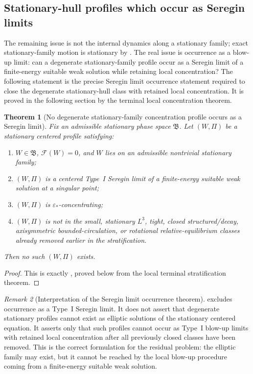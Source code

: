 \documentclass[11pt]{amsart}
\numberwithin{equation}{section}
\theoremstyle{plain}
\newtheorem{theorem}{Theorem}[section]
\theoremstyle{definition}
\theoremstyle{remark}
\newtheorem{remark}[theorem]{Remark}
\begin{document}
\subsection{Stationary-hull profiles which occur as Seregin limits}

The remaining issue is not the internal dynamics along a stationary family; exact
stationary-family
motion is stationary by .  The real
issue is occurrence as a blow-up limit: can a degenerate stationary-family
profile occur as a Seregin limit of a finite-energy suitable weak solution
while retaining local concentration?  The following statement is the precise
Seregin limit occurrence statement
required to close the degenerate stationary-hull class with retained local
concentration.  It is proved in the following section by the terminal local
concentration theorem.

\begin{theorem}[No degenerate stationary-family concentration profile occurs as a Seregin limit]
\label{thm:R3-no-attainable-degenerate-family}
Fix an admissible stationary phase space \(\mathfrak B\).  Let \((W,\Pi)\) be a
stationary centered profile satisfying:
\begin{enumerate}[label=(\roman*)]
   \item \(W\in\mathfrak B\), \(\mathcal F(W)=0\), and \(W\) lies on an
      admissible nontrivial stationary family;
   \item \((W,\Pi)\) is a centered Type~I Seregin limit of a finite-energy
      suitable weak solution at a singular point;
   \item \((W,\Pi)\) is \(\varepsilon_*\)-concentrating;
   \item \((W,\Pi)\) is not in the small, stationary \(L^3\), tight, closed
      structured/decay, axisymmetric bounded-circulation, or rotational
      relative-equilibrium classes already removed earlier in the stratification.
\end{enumerate}
Then no such \((W,\Pi)\) exists.
\end{theorem}

\begin{proof}
This is exactly , proved below from
the local terminal stratification theorem.
\end{proof}

\begin{remark}[Interpretation of the Seregin limit occurrence theorem]
\label{rem:R3-input-interpretation}
 excludes occurrence
as a Type~I Seregin limit.  It does not assert that degenerate stationary profiles cannot
exist as elliptic solutions of the stationary centered equation.  It asserts
only that such profiles cannot occur as Type~I blow-up limits with retained
local concentration after all previously closed classes have been removed.  This
is the correct formulation for the residual problem: the elliptic family may
exist, but it cannot be reached by the local blow-up procedure coming from a
finite-energy suitable weak solution.
\end{remark}
\end{document}
